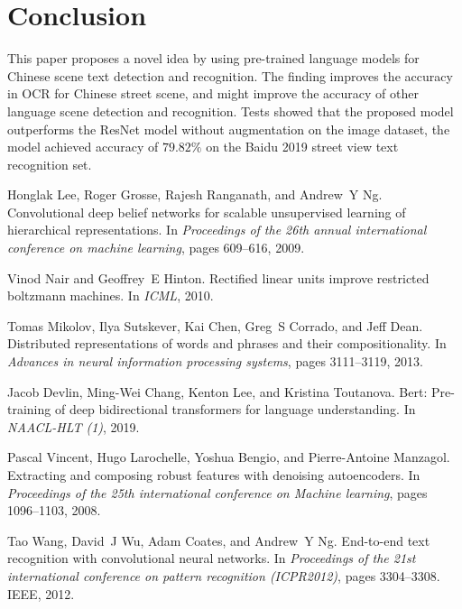 \documentclass[review]{cvpr}
\begin{document}
\section{Conclusion}

This paper proposes a novel idea by using pre-trained language models for Chinese scene text detection and recognition.
The finding improves the accuracy in OCR for Chinese street scene, and might improve the accuracy of other language scene detection and recognition.
Tests showed that the proposed model outperforms the ResNet model without augmentation on the image dataset,
the model achieved accuracy of $79.82\%$ on the Baidu 2019 street view text recognition set.



{\small

%
\begin{thebibliography}{10}

Honglak Lee, Roger Grosse, Rajesh Ranganath, and Andrew~Y Ng.
\newblock Convolutional deep belief networks for scalable unsupervised learning
  of hierarchical representations.
\newblock In {\em Proceedings of the 26th annual international conference on
  machine learning}, pages 609--616, 2009.


Vinod Nair and Geoffrey~E Hinton.
\newblock Rectified linear units improve restricted boltzmann machines.
\newblock In {\em ICML}, 2010.


Tomas Mikolov, Ilya Sutskever, Kai Chen, Greg~S Corrado, and Jeff Dean.
\newblock Distributed representations of words and phrases and their
  compositionality.
\newblock In {\em Advances in neural information processing systems}, pages
  3111--3119, 2013.


Jacob Devlin, Ming-Wei Chang, Kenton Lee, and Kristina Toutanova.
\newblock Bert: Pre-training of deep bidirectional transformers for language
  understanding.
\newblock In {\em NAACL-HLT (1)}, 2019.


Pascal Vincent, Hugo Larochelle, Yoshua Bengio, and Pierre-Antoine Manzagol.
\newblock Extracting and composing robust features with denoising autoencoders.
\newblock In {\em Proceedings of the 25th international conference on Machine
  learning}, pages 1096--1103, 2008.


Tao Wang, David~J Wu, Adam Coates, and Andrew~Y Ng.
\newblock End-to-end text recognition with convolutional neural networks.
\newblock In {\em Proceedings of the 21st international conference on pattern
  recognition (ICPR2012)}, pages 3304--3308. IEEE, 2012.



\end{thebibliography}}
\end{document}

